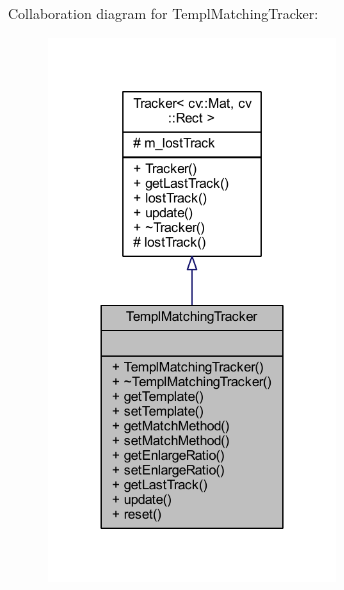 Collaboration diagram for Templ\+Matching\+Tracker\+:
\nopagebreak
\begin{figure}[H]
\begin{center}
\leavevmode
\includegraphics[width=216pt]{class_viscv_1_1_templ_matching_tracker__coll__graph}
\end{center}
\end{figure}
